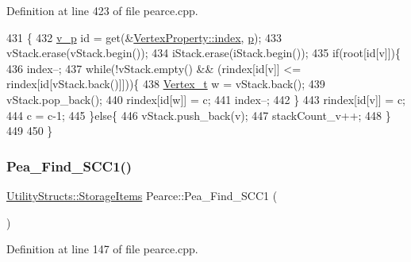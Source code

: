 Definition at line 423 of file pearce.\+cpp.


\begin{DoxyCode}
431                                                \{
432     \hyperlink{utilities_8h_a3f4959b3d837fa6351a9414c79280286}{v\_p} \textcolor{keywordtype}{id} = \textcolor{keyword}{get}(&\hyperlink{struct_utility_structs_1_1_vertex_property_a636cb729438e999aa3d9a17ac39d8641}{VertexProperty::index}, \hyperlink{class_pearce_a2320928312fd97f6bcb1f16684f79a03}{p});
433     vStack.erase(vStack.begin());
434     iStack.erase(iStack.begin());
435     \textcolor{keywordflow}{if}(root[\textcolor{keywordtype}{id}[v]])\{
436         index--;
437         \textcolor{keywordflow}{while}(!vStack.empty() && (rindex[\textcolor{keywordtype}{id}[v]] <= rindex[\textcolor{keywordtype}{id}[vStack.back()]]))\{
438             \hyperlink{utilities_8h_a344cd987714d06997f0becda3c96d6e2}{Vertex\_t} w = vStack.back();
439             vStack.pop\_back();
440             rindex[\textcolor{keywordtype}{id}[w]] = c;
441             index--;
442         \}
443         rindex[\textcolor{keywordtype}{id}[v]] = c;
444         c = c-1;
445     \}\textcolor{keywordflow}{else}\{
446         vStack.push\_back(v);
447         stackCount\_v++;
448     \}
449 
450 \}
\end{DoxyCode}
\mbox{\label{class_pearce_a4a78c1ec037146537f575fa62b1e0265}} 
\subsubsection{\texorpdfstring{Pea\+\_\+\+Find\+\_\+\+S\+C\+C1()}{Pea\_Find\_SCC1()}}
{\footnotesize\ttfamily \hyperlink{struct_utility_structs_1_1_storage_items}{Utility\+Structs\+::\+Storage\+Items} Pearce\+::\+Pea\+\_\+\+Find\+\_\+\+S\+C\+C1 (\begin{DoxyParamCaption}{ }\end{DoxyParamCaption})}



Definition at line 147 of file pearce.\+cpp.


